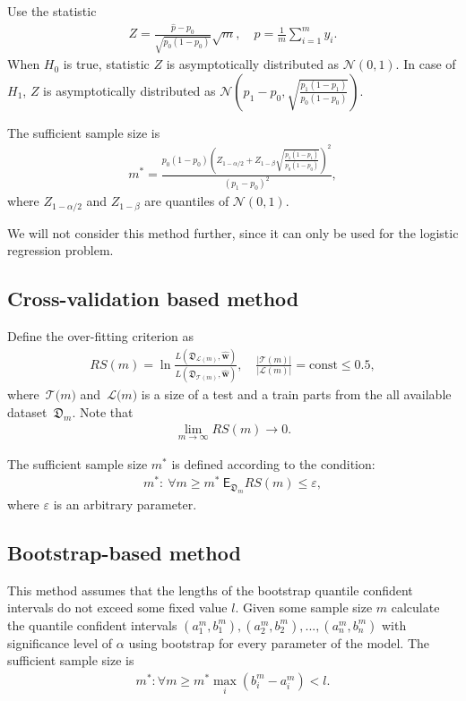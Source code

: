 \documentclass[
11pt,%
tightenlines,%
twoside,%
onecolumn,%
nofloats,%
nobibnotes,%
nofootinbib,%
superscriptaddress,%
noshowpacs,%
centertags]%
{revtex4}
\begin{document}
Use the statistic
\[
\label{eq:hb:3}
\begin{aligned}
	Z = \frac{\hat{p}-p_0}{\sqrt{p_0(1-p_0)}}\sqrt{m}, \quad \hat{p} = \frac{1}{m}\sum_{i=1}^{m}y_i.
\end{aligned}
\]
When $H_0$ is true, statistic $Z$ is asymptotically distributed as $\mathcal{N}\left(0, 1\right)$. In case of $H_1$, $Z$ is asymptotically distributed as $ \mathcal{N}\left(p_1-p_0, \sqrt{\frac{p_1(1-p_1)}{p_0(1-p_0)}}\right)$.
      
The sufficient sample size is
\[
\label{eq:hb:4}
\begin{aligned}
	m^* = \frac{p_0(1-p_0)\left(Z_{1-\alpha/2} + Z_{1-\beta}\sqrt{\frac{p_1(1-p_1)}{p_0(1-p_0)}}\right)^2}{(p_1-p_0)^2},
\end{aligned}
\]
where $Z_{1-\alpha/2}$ and $Z_{1-\beta}$ are quantiles of $\mathcal{N}\left(0, 1\right)$.
    
We will not consider this method further, since it can only be used for the logistic regression problem.
    
\subsection{Cross-validation based method}
Define the over-fitting criterion as
\[
\label{eq:hb:5}
\begin{aligned}
	RS(m) = \ln\frac{L(\mathfrak{D}_{\mathcal{L}(m)}, \hat{\textbf{w}})}{L(\mathfrak{D}_{\mathcal{T}(m)}, \hat{\textbf{w}})}, \quad \frac{|\mathcal{T}(m)|}{|\mathcal{L}(m)|} = \text{const} \leq 0.5,
\end{aligned}
\]
where~$\mathcal{T}\bigr(m\bigr)$ and~$\mathcal{L}\bigr(m\bigr)$ is a size of a test and a train parts from the all available dataset~$\mathfrak{D}_{m}$.
Note that 
\[
\label{eq:hb:6}
\begin{aligned}
	\lim_{m\to \infty}RS(m) \to 0.
\end{aligned}
\]

The sufficient sample size $m^*$ is defined according to the condition:
\[
\label{eq:hb:7}
\begin{aligned}
	m^*:~\forall m \geq m^*~\mathsf{E}_{\mathfrak{D}_{m}}RS(m) \leq \varepsilon,
\end{aligned}
\]
where $\varepsilon$ is an arbitrary parameter.

\subsection{Bootstrap-based method}
This method assumes that the lengths of the bootstrap quantile confident intervals do not exceed some fixed value $l$. Given some sample size $m$ calculate the quantile confident intervals $\left(a^m_1, b^m_1\right), \left(a^m_2, b^m_2\right), ..., \left(a^m_n, b^m_n\right)$ with significance level of $\alpha$ using bootstrap for every parameter of the model. The sufficient sample size is
\[
\label{eq:hb:8}
\begin{aligned}
	m^*: \forall m\geq m^* \max_i\left(b^m_i - a^m_i\right) < l.
\end{aligned}
\]
    
\end{document}
